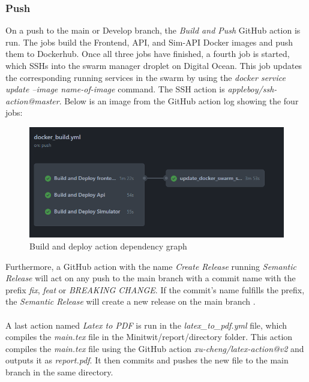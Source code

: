 \subsubsection{Push}
On a push to the main or Develop branch, the \textit{Build and Push} GitHub action is run. The jobs build the Frontend, API, and Sim-API Docker images and push them to Dockerhub. Once all three jobs have finished, a fourth job is started, which SSHs into the swarm manager droplet on Digital Ocean. This job updates the corresponding running services in the swarm by using the \textit{docker service update --image name-of-image} command. The SSH action is \textit{appleboy/ssh-action@master}\cite{ssh-action}. Below is an image from the GitHub action log showing the four jobs:

\begin{figure}[H]
    \centering
    \includegraphics[width=1\linewidth]{report/images/build-and-deploy-action.png}
    \caption{Build and deploy action dependency graph}
    \label{fig:build-and-deploy}
\end{figure}

Furthermore, a GitHub action with the name \textit{Create Release} running \textit{Semantic Release} will act on any push to the main branch with a commit name with the prefix \textit{fix}, \textit{feat} or \textit{BREAKING CHANGE}. If the commit's name fulfills the prefix, the \textit{Semantic Release} will create a new release on the main branch \cite{semantic-release}.\\
\\
A last action named \textit{Latex to PDF} is run in the \textit{latex\_to\_pdf.yml} file, which compiles the \textit{main.tex} file in the Minitwit/report/directory folder. This action compiles the \textit{main.tex} file using the GitHub action \textit{xu-cheng/latex-action@v2} \cite{latex-action} and outputs it as \textit{report.pdf}. It then commits and pushes the new file to the main branch in the same directory.

